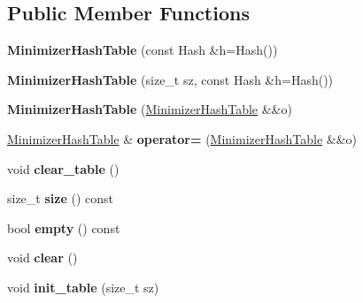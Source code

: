 \subsection*{Public Member Functions}
\begin{DoxyCompactItemize}
\item 
\mbox{\label{structMinimizerHashTable_af9c37455160394f2118cec3f7fa31664}} 
{\bfseries Minimizer\+Hash\+Table} (const Hash \&h=Hash())
\item 
\mbox{\label{structMinimizerHashTable_a435d05ba4726967e962fe725d9e394a0}} 
{\bfseries Minimizer\+Hash\+Table} (size\+\_\+t sz, const Hash \&h=Hash())
\item 
\mbox{\label{structMinimizerHashTable_af54b95a3fc99cf89a5fd445ace588d0e}} 
{\bfseries Minimizer\+Hash\+Table} (\hyperlink{structMinimizerHashTable}{Minimizer\+Hash\+Table} \&\&o)
\item 
\mbox{\label{structMinimizerHashTable_a796bcc195ed968283fe7ba68aaf4c156}} 
\hyperlink{structMinimizerHashTable}{Minimizer\+Hash\+Table} \& {\bfseries operator=} (\hyperlink{structMinimizerHashTable}{Minimizer\+Hash\+Table} \&\&o)
\item 
\mbox{\label{structMinimizerHashTable_a1ad677532589c8600cf1ed084538b5c0}} 
void {\bfseries clear\+\_\+table} ()
\item 
\mbox{\label{structMinimizerHashTable_a74db0376587b391e4aff0ccbbb70b3b1}} 
size\+\_\+t {\bfseries size} () const
\item 
\mbox{\label{structMinimizerHashTable_a877d8a5ce3367393c485a21b6cf5329b}} 
bool {\bfseries empty} () const
\item 
\mbox{\label{structMinimizerHashTable_ac775a51cd392cd3d8728f3802543a440}} 
void {\bfseries clear} ()
\item 
\mbox{\label{structMinimizerHashTable_a0a64b784d6736c213e5a366d2237c0ed}} 
void {\bfseries init\+\_\+table} (size\+\_\+t sz)
\item 

\end{DoxyCompactItemize}
